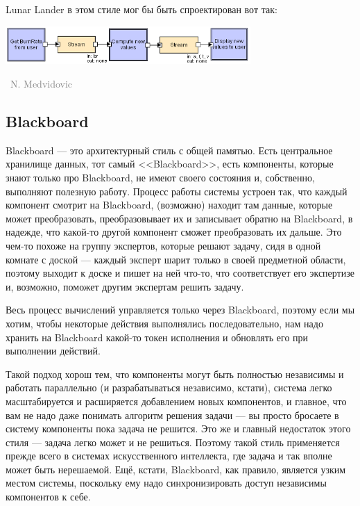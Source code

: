 \documentclass[a5paper]{article}
\newcommand{\attribution}[1] {
    \vspace{-4mm}\begin{flushright}\begin{scriptsize}\textcolor{gray}
    {\textcopyright\, #1}\end{scriptsize}\end{flushright}
}
\begin{document}
Lunar Lander в этом стиле мог бы быть спроектирован вот так:

\begin{center}
    \includegraphics[width=0.7\textwidth]{pipesAndFiltersLL.png}
    \attribution{N. Medvidovic}
\end{center}

\subsection{Blackboard}

Blackboard --- это архитектурный стиль с общей памятью. Есть центральное хранилище данных, тот самый <<Blackboard>>, есть компоненты, которые знают только про Blackboard, не имеют своего состояния и, собственно, выполняют полезную работу. Процесс работы системы устроен так, что каждый компонент смотрит на Blackboard, (возможно) находит там данные, которые может преобразовать, преобразовывает их и записывает обратно на Blackboard, в надежде, что какой-то другой компонент сможет преобразовать их дальше. Это чем-то похоже на группу экспертов, которые решают задачу, сидя в одной комнате с доской --- каждый эксперт шарит только в своей предметной области, поэтому выходит к доске и пишет на ней что-то, что соответствует его экспертизе и, возможно, поможет другим экспертам решить задачу. 

Весь процесс вычислений управляется только через Blackboard, поэтому если мы хотим, чтобы некоторые действия выполнялись последовательно, нам надо хранить на Blackboard какой-то токен исполнения и обновлять его при выполнении действий.

Такой подход хорош тем, что компоненты могут быть полностью независимы и работать параллельно (и разрабатываться независимо, кстати), система легко масштабируется и расширяется добавлением новых компонентов, и главное, что вам не надо даже понимать алгоритм решения задачи --- вы просто бросаете в систему компоненты пока задача не решится. Это же и главный недостаток этого стиля --- задача легко может и не решиться. Поэтому такой стиль применяется прежде всего в системах искусственного интеллекта, где задача и так вполне может быть нерешаемой. Ещё, кстати, Blackboard, как правило, является узким местом системы, поскольку ему надо синхронизировать доступ независимы компонентов к себе.
\end{document}
